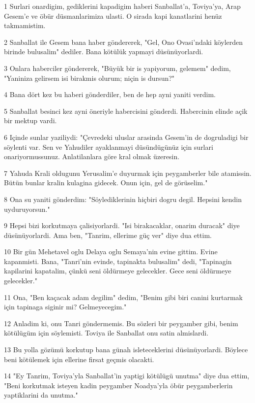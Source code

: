 \par 1 Surlari onardigim, gediklerini kapadigim haberi Sanballat'a, Toviya'ya, Arap Gesem'e ve öbür düsmanlarimiza ulasti. O sirada kapi kanatlarini henüz takmamistim.
\par 2 Sanballat ile Gesem bana haber göndererek, "Gel, Ono Ovasi'ndaki köylerden birinde bulusalim" dediler. Bana kötülük yapmayi düsünüyorlardi.
\par 3 Onlara haberciler göndererek, "Büyük bir is yapiyorum, gelemem" dedim, "Yaniniza gelirsem isi birakmis olurum; niçin is dursun?"
\par 4 Bana dört kez bu haberi gönderdiler, ben de hep ayni yaniti verdim.
\par 5 Sanballat besinci kez ayni öneriyle habercisini gönderdi. Habercinin elinde açik bir mektup vardi.
\par 6 Içinde sunlar yaziliydi: "Çevredeki uluslar arasinda Gesem'in de dogruladigi bir söylenti var. Sen ve Yahudiler ayaklanmayi düsündügünüz için surlari onariyormussunuz. Anlatilanlara göre kral olmak üzeresin.
\par 7 Yahuda Krali oldugunu Yerusalim'e duyurmak için peygamberler bile atamissin. Bütün bunlar kralin kulagina gidecek. Onun için, gel de görüselim."
\par 8 Ona su yaniti gönderdim: "Söylediklerinin hiçbiri dogru degil. Hepsini kendin uyduruyorsun."
\par 9 Hepsi bizi korkutmaya çalisiyorlardi. "Isi birakacaklar, onarim duracak" diye düsünüyorlardi. Ama ben, "Tanrim, ellerime güç ver" diye dua ettim.
\par 10 Bir gün Mehetavel oglu Delaya oglu Semaya'nin evine gittim. Evine kapanmisti. Bana, "Tanri'nin evinde, tapinakta bulusalim" dedi, "Tapinagin kapilarini kapatalim, çünkü seni öldürmeye gelecekler. Gece seni öldürmeye gelecekler."
\par 11 Ona, "Ben kaçacak adam degilim" dedim, "Benim gibi biri canini kurtarmak için tapinaga siginir mi? Gelmeyecegim."
\par 12 Anladim ki, onu Tanri göndermemis. Bu sözleri bir peygamber gibi, benim kötülügüm için söylemisti. Toviya ile Sanballat onu satin almislardi.
\par 13 Bu yolla gözümü korkutup bana günah isleteceklerini düsünüyorlardi. Böylece beni kötülemek için ellerine firsat geçmis olacakti.
\par 14 "Ey Tanrim, Toviya'yla Sanballat'in yaptigi kötülügü unutma" diye dua ettim, "Beni korkutmak isteyen kadin peygamber Noadya'yla öbür peygamberlerin yaptiklarini da unutma."
